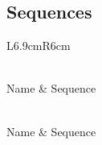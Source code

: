 \subsection{Sequences}
{
\setlength{\tabcolsep}{5pt}
\begin{longtable}{L{6.9cm}R{6cm}}
	\caption[List of Sequences Used in This Work]{List of sequences used in this work.\label{tbl-mat-seq}}\\
	\toprule
	{Name} & {Sequence} \\
	\hline \endfirsthead
	\caption[]{\textit{continued from the previous page}} \\
	\toprule
	{Name} & {Sequence} \\
	\hline \endhead
	\hline
	 \\
	\endfoot
	\bottomrule
	\endlastfoot
\end{longtable}
}

